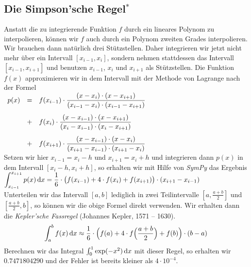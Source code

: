 \subsection{Die Simpson'sche Regel$^*$}
Anstatt die zu integrierende Funktion $f$ durch ein lineares Polynom zu interpolieren,
k\"onnen wir $f$ auch durch ein Polynom zweiten Grades interpolieren.  Wir brauchen dann
nat\"urlich drei St\"utzstellen. Daher integrieren wir jetzt nicht mehr \"uber ein Intervall
$[x_{i-1},x_i]$, sondern nehmen stattdessen das Intervall $[x_{i-1},x_{i+1}]$ und
benutzen $x_{i-1}$, $x_i$ und $x_{i+1}$ als St\"utzstellen.
Die Funktion $f(x)$ approximieren wir in dem Intervall mit der Methode von Lagrange nach
der Formel
\\[0.2cm]
\hspace*{1.3cm}
$
\begin{array}[t]{lcl}
p(x) & = & \displaystyle f(x_{i-1})\cdot \frac{(x-x_i)\cdot (x-x_{i+1})}{(x_{i-1}-x_i)\cdot (x_{i-1}-x_{i+1})}  \\[0.5cm]
     & + & \displaystyle f(x_{i})\cdot \frac{(x-x_{i-1})\cdot (x-x_{i+1})}{(x_{i}-x_{i-1})\cdot (x_{i}-x_{i+1})}  \\[0.5cm]
     & + & \displaystyle f(x_{i+1})\cdot \frac{(x-x_{i-1})\cdot (x-x_{i})}{(x_{i+1}-x_{i-1})\cdot (x_{i+1}-x_{i})}
\end{array}$
\\[0.2cm]
Setzen wir hier $x_{i-1}= x_i-h$ und $x_{i+1}= x_i+h$ und
integrieren dann $p(x)$ in dem Intervall $[x_{i}-h,x_{i}+h]$, so erhalten wir mit Hilfe von \textsl{SymPy} das Ergebnis 
\\[0.2cm]
\hspace*{1.3cm}
$\displaystyle \int_{x_{i-1}}^{x_{i+1}} p(x)\,\textrm{d} x = \frac{1}{6}\cdot \bigl(f(x_{i-1}) + 4 \cdot  f(x_i) + f(x_{i+1})\bigr)\cdot (x_{i+1}-x_{i-1})$
\\[0.2cm]
Unterteilen wir das Intervall $[a,b]$ lediglich in zwei Teilintervalle $[a,\frac{a+b}{2}]$
und $[\frac{a+b}{2},b]$, so k\"onnen wir die obige Formel direkt verwenden.  Wir erhalten
dann die \emph{Kepler'sche Fassregel} (Johannes Kepler, 1571 -- 1630).
\begin{equation}
  \label{eq:keplerFass}
  \int_a^b f(x)\,\textrm{d} x \approx \frac{1}{6} \cdot \Bigl( f(a) + 4 \cdot f\Bigl(\frac{a+b}{2}\Bigr) + f(b)\Bigr)\cdot (b-a)
\end{equation}
Berechnen wir das Integral $\int_0^1 \exp(-x^2)\, \textrm{d} x$ mit dieser Regel, so erhalten wir 
$0.7471804290$ und der Fehler ist bereits kleiner als $4 \cdot 10^{-4}$.

